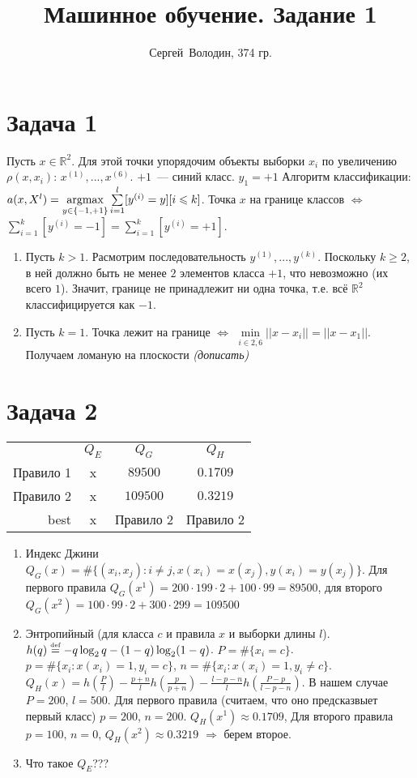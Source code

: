 \documentclass[a4paper]{article}
\title{Машинное обучение. Задание 1}
\author{Сергей~Володин, 374 гр.}
\def\eqdef{\overset{\mbox{\tiny def}}{=}}
\newcommand\argmax{\operatornamewithlimits{argmax}\limits}
\begin{document}
\maketitle
\section*{Задача 1}
Пусть $x\in\mathbb{R}^2$. Для этой точки упорядочим объекты выборки $x_i$ по увеличению $\rho(x,x_i)$: $x^{(1)}, ..., x^{(6)}$. $+1$~--- синий класс. $y_1=+1$ Алгоритм 
классификации: $a(x,X^l)=\argmax_{y\in\{-1,+1\}}\sum\limits_{i=1}^l[y^{(i)}=y][i\leqslant k]$. Точка $x$ на границе классов $\Leftrightarrow$ $\sum\limits_{i=1}^k[y^{(i)}=-1]=\sum\limits_{i=1}^k[y^{(i)}=+1]$.
\begin{enumerate}
\item Пусть $k>1$. Расмотрим последовательность $y^{(1)},...,y^{(k)}$.
Поскольку $k\geqslant 2$, в ней должно быть не менее $2$ элементов класса $+1$, что невозможно (их всего $1$). Значит, границе не принадлежит ни одна точка, т.е. всё $\mathbb{R}^2$ классифицируется как $-1$.
\item Пусть $k=1$. Точка лежит на границе $\Leftrightarrow$ $\min\limits_{i\in\overline{2,6}}||x-x_i||=||x-x_1||$. Получаем ломаную на плоскости {\em (дописать)}
\end{enumerate}
\section*{Задача 2}
\begin{tabular}{rccc}
 &  $Q_E$ & $Q_G$ & $Q_H$\\
Правило 1 & x &  $89500$ & $0.1709$ \\
Правило 2 & x & $109500$ & $0.3219$ \\
best & x & Правило 2 & Правило 2 \\
\end{tabular}
\begin{enumerate}
\item Индекс Джини $Q_G(x)=\#\{(x_i,x_j)\colon i\neq j, x(x_i)=x(x_j), y(x_i)=y(x_j)\}$. Для первого правила $Q_G(x^1)=200\cdot 199\cdot 2+100\cdot 99=89500$, для второго $Q_G(x^2)=100\cdot 99\cdot 2+300\cdot 299=109500$
\item Энтропийный (для класса $c$ и правила $x$ и выборки длины $l$). $h(q)\eqdef -q\log_2 q-(1-q)\log_2 (1-q)$. $P=\#\{x_i=c\}$. $p=\#\{x_i\colon x(x_i)=1, y_i=c\}$, $n=\#\{x_i\colon x(x_i)=1, y_i\neq c\}$. $Q_H(x)=h(\frac{P}{l})-\frac{p+n}{l}h(\frac{p}{p+n})-\frac{l-p-n}{l}h(\frac{P-p}{l-p-n})$. В нашем случае $P=200$, $l=500$. Для первого правила (считаем, что оно предсказвыет первый класс) $p=200$, $n=200$. $Q_H(x^1)\approx 0.1709$, Для второго правила $p=100,\,n=0$, $Q_H(x^2)\approx 0.3219$ $\Rightarrow$ берем второе.
\item Что такое $Q_E$???
\end{enumerate}
\end{document}
